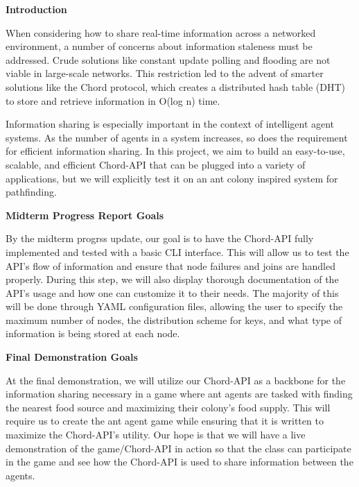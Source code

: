 \begin{large}
    \noindent\textbf{Introduction}
\end{large}

\vspace{5pt}

When considering how to share real-time information across a networked environment, a number of concerns about information staleness must be addressed.
Crude solutions like constant update polling and flooding are not viable in large-scale networks.
This restriction led to the advent of smarter solutions like the Chord protocol, which creates a distributed hash table (DHT) to store and retrieve information in O(log n) time.

\vspace{5pt}

Information sharing is especially important in the context of intelligent agent systems.
As the number of agents in a system increases, so does the requirement for efficient information sharing.
In this project, we aim to build an easy-to-use, scalable, and efficient Chord-API that can be plugged into a variety of applications, but we will explicitly test it on an ant colony inspired system for pathfinding.

\vspace{5pt}

\begin{large}
    \noindent\textbf{Midterm Progress Report Goals}
\end{large}

By the midterm progrss update, our goal is to have the Chord-API fully implemented and tested with a basic CLI interface.
This will allow us to test the API's flow of information and ensure that node failures and joins are handled properly.
During this step, we will also display thorough documentation of the API's usage and how one can customize it to their needs.
The majority of this will be done through YAML configuration files, allowing the user to specify the maximum number of nodes, the distribution scheme for keys, and what type of information is being stored at each node.

\vspace{5pt}

\begin{large}
    \noindent\textbf{Final Demonstration Goals}
\end{large}

At the final demonstration, we will utilize our Chord-API as a backbone for the information sharing necessary in a game where ant agents are tasked with finding the nearest food source and maximizing their colony's food supply.
This will require us to create the ant agent game while ensuring that it is written to maximize the Chord-API's utility.
Our hope is that we will have a live demonstration of the game/Chord-API in action so that the class can participate in the game and see how the Chord-API is used to share information between the agents.

\pagebreak